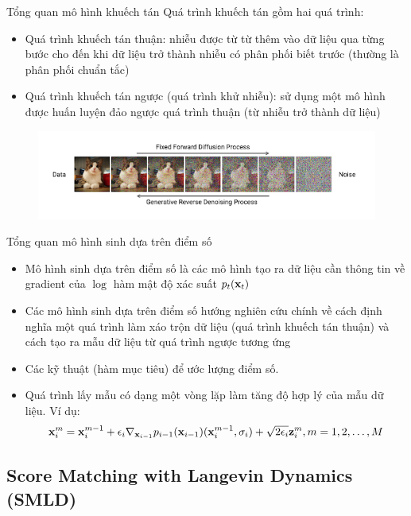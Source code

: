 \documentclass[10pt]{beamer}
\theoremstyle{remark}
\numberwithin{algocf}{section}
\numberwithin{equation}{section}
\numberwithin{dl}{section}
\numberwithin{figure}{section}
\begin{document}
\begin{frame}{Tổng quan mô hình khuếch tán}
	Quá trình khuếch tán gồm hai quá trình:
	\begin{itemize}
		\item Quá trình khuếch tán thuận: nhiễu được từ từ thêm vào dữ liệu qua từng bước cho đến khi dữ liệu trở thành nhiễu có phân phối biết trước (thường là phân phối chuẩn tắc)
		\item Quá trình khuếch tán ngược (quá trình khử nhiễu): sử dụng một mô hình được huấn luyện đảo ngược quá trình thuận (từ nhiễu trở thành dữ liệu)
	\end{itemize}
	\begin{figure}[H]
		\centering
		\includegraphics[width=0.9\linewidth]{figures/Fixed_Forward_Diffusion_Process.png}
	\end{figure}
\end{frame}

\begin{frame}{Tổng quan mô hình sinh dựa trên điểm số}
	\begin{itemize}
		\item Mô hình sinh dựa trên điểm số là các mô hình tạo ra dữ liệu cần thông tin về gradient của $\log$ hàm mật độ xác suất $p_t(\bold{x}_t)$
		\item Các mô hình sinh dựa trên điểm số hướng nghiên cứu chính về cách định nghĩa một quá trình làm xáo trộn dữ liệu (quá trình khuếch tán thuận) và cách tạo ra mẫu dữ liệu từ quá trình ngược tương ứng
		\item Các kỹ thuật (hàm mục tiêu) để ước lượng điểm số.
		\item Quá trình lấy mẫu có dạng một vòng lặp làm tăng độ hợp lý của mẫu dữ liệu. Ví dụ:
		\begin{equation*}
			\bold{x}_i^m = \bold{x}_i^{m-1} + \epsilon_i \nabla_{\bold{x}_{i-1}} p_{i-1}(\bold{x}_{i-1}) (\bold{x}_i^{m-1}, \sigma_i) + \sqrt{2 \epsilon_i} \bold{z}_i^m, m = 1, 2, \dots, M
		\end{equation*}
	\end{itemize}
\end{frame}

\subsection{Score Matching with Langevin Dynamics (SMLD)}
\end{document}
